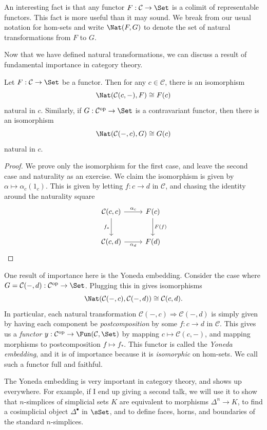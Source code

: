 \documentclass[11pt, A4]{article}
\begin{document}
An interesting fact is that any functor $F : \mathcal{C}  \to \Set $ is a colimit of representable functors. This fact is more useful than it may sound. We break from our usual notation for hom-sets and write $\Nat(F,G)$ to denote the set of natural transformations from $F$ to $G$.

Now that we have defined natural transformations, we can discuss a result of fundamental importance in category theory.

\begin{lemma}[Yoneda]\label{5.3}
	Let $F : \mathcal{C}  \to \Set $ be a functor. Then for any $c\in \mathcal{C} $, there is an isomorphism
	\[
		\Nat(\mathcal{C} (c,-),F)\cong F(c)
	\]
	natural in $c$. Similarly, if $G : \mathcal{C} ^{\mathrm{op}}  \to \Set $ is a contravariant functor, then there is an isomorphism
	\[
		\Nat (\mathcal{C} (-,c),G)\cong G(c)
	\]
	natural in $c$.
\end{lemma}
\begin{proof}
	We prove only the isomorphism for the first case, and leave the second case and naturality as an exercise. We claim the isomorphism is given by $\alpha \mapsto \alpha_c(1_c)$. This is given by letting $f : c \to d$ in $\mathcal{C} $, and chasing the identity around the naturality square
	\[\begin{tikzcd}[row sep = 2.5em, column sep = 2.5em]
	\mathcal{C} (c,c)\ar[" \alpha _c ", r] \ar[" f_* "', d]  & F(c)\ar[" F(f) ", d]  \\
	\mathcal{C} (c,d)\ar[" \alpha _d "', r]  & F(d)
	\end{tikzcd}\]
\end{proof}
One result of importance here is the Yoneda embedding. Consider the case where $G=\mathcal{C} (-,d): \mathcal{C} ^{\mathrm{op}}  \to \Set $. Plugging this in gives isomorphisms
\[
	\Nat(\mathcal{C} (-,c),\mathcal{C} (-,d))\cong \mathcal{C} (c,d)
.\]
In particular, each natural transformation $\mathcal{C} (-,c)\Rightarrow \mathcal{C} (-,d)$ is simply given by having each component be \emph{postcomposition} by some $f : c \to d$ in $\mathcal{C} $. This gives us a \emph{functor} $y : \mathcal{C} ^{\mathrm{op}}  \to \Fun(\mathcal{C} ,\Set )$ by mapping $c\mapsto \mathcal{C} (c,-)$, and mapping morphisms to postcomposition $f\mapsto f_*$. This functor is called the \emph{Yoneda embedding}, and it is of importance because it is \emph{isomorphic} on hom-sets. We call such a functor full and faithful.

The Yoneda embedding is very important in category theory, and shows up everywhere. For example, if I end up giving a second talk, we will use it to show that $n$-simplices of simplicial sets $K$ are equivalent to morphisms $\Delta ^n\to K$, to find a cosimplicial object $\Delta ^{\bullet} $ in $\sSet $, and to define faces, horns, and boundaries of the standard $n$-simplices.
\end{document}
